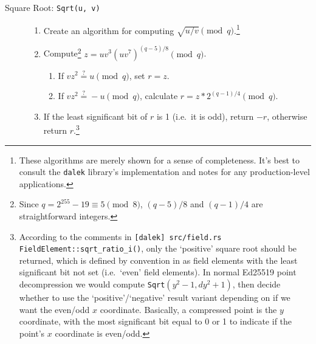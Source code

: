 \begin{description}
    \item [Square Root: {\tt Sqrt(u, v)}] \hfill
        \begin{enumerate}
            \item Create an algorithm for computing $\sqrt{u/v} \pmod q$.\footnote{These algorithms are merely shown for a sense of completeness. It's best to consult the {\tt dalek} library's implementation and notes \cite{ristretto} for any production-level applications.}
            \item Compute\footnote{Since $q = 2^{255}-19 \equiv 5 \pmod{8}$, $(q-5)/8$ and $(q-1)/4$ are straightforward integers.} \(z = u v^3 (u v^7)^{(q-5)/8} \pmod q\).
            \begin{enumerate}
                \item If \(v z^2 \stackrel{?}{=} u \pmod q\), set \(r = z\).
                \item If \(v z^2 \stackrel{?}{=} -u \pmod q\), calculate \(r = z*2^{(q-1)/4} \pmod q\).
            \end{enumerate}
            \item If the least significant bit of $r$ is 1 (i.e.\ it is odd), return $-r$, otherwise return $r$.\footnote{\label{footnote:point-comp-positive-convention-normal-decompression}According to the comments in {\tt [dalek] src/field.rs FieldElement::sqrt\_ratio\_i()}, only the `positive' square root should be returned, which is defined by convention in \cite{Bernstein2012-high-speed-high-security-ed25519} as field elements with the least significant bit not set (i.e.\ `even' field elements). In normal Ed25519 point decompression \cite{Bernstein2012-high-speed-high-security-ed25519} we would compute {\tt Sqrt}$(y^2 - 1, d y^2 + 1)$, then decide whether to use the `positive'/`negative' result variant depending on if we want the even/odd $x$ coordinate. Basically, a compressed point is the $y$ coordinate, with the most significant bit equal to 0 or 1 to indicate if the point's $x$ coordinate is even/odd.}
        \end{enumerate}


\end{description}
